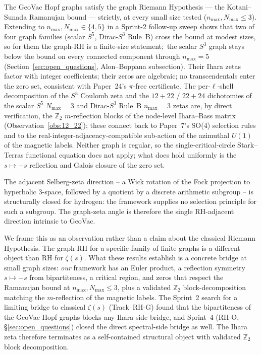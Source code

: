 \documentclass[11pt]{article}
\begin{document}
The GeoVac Hopf graphs satisfy the graph Riemann Hypothesis --- the
Kotani--Sunada Ramanujan bound --- strictly, at every small size
tested ($n_{\max},N_{\max}\le 3$).  Extending to $n_{\max},N_{\max}
\in\{4,5\}$ in a Sprint-2 follow-up sweep shows that two of four
graph families (scalar $S^5$, Dirac-$S^3$ Rule~B) cross the bound at
modest sizes, so for them the graph-RH is a finite-size statement;\
the scalar $S^3$ graph stays below the bound on every connected
component through $n_{\max}=5$ (Section~\ref{sec:open_questions},
Alon--Boppana subsection).  Their Ihara zetas factor with integer coefficients; their
zeros are algebraic; no transcendentals enter the zero set, consistent
with Paper~24's $\pi$-free certificate.  The per-$\ell$-shell
decomposition of the $S^3$ Coulomb zeta and the $12+22$ / $22+24$
dichotomies of the scalar $S^5$ $N_{\max}=3$ and Dirac-$S^3$ Rule~B
$n_{\max}=3$ zetas are, by direct verification, the $\mathbb{Z}_2$
$m$-reflection blocks of the node-level Ihara--Bass matrix
(Observation~\ref{obs:12_22}); these connect back to Paper~7's SO(4)
selection rules and to the real-integer-adjacency-compatible
sub-action of the azimuthal $U(1)$ of the magnetic labels.  Neither graph
is regular, so the single-critical-circle Stark--Terras functional
equation does not apply; what does hold uniformly is the
$s\mapsto -s$ reflection and Galois closure of the zero set.

The adjacent Selberg-zeta direction -- a Wick rotation of the Fock
projection to hyperbolic 3-space, followed by a quotient by a
discrete arithmetic subgroup -- is structurally closed for hydrogen:
the framework supplies no selection principle for such a subgroup.
The graph-zeta angle is therefore the single RH-adjacent direction
intrinsic to GeoVac.

We frame this as an observation rather than a claim about the
classical Riemann Hypothesis.  The graph-RH for a specific family
of finite graphs is a different object than RH for $\zeta(s)$.  What
these results establish is a concrete bridge at small graph sizes:
\emph{our} framework has an Euler product, a reflection symmetry
$s\mapsto -s$ from bipartiteness, a critical region, and zeros that respect
the Ramanujan bound at $n_{\max},N_{\max}\le 3$, plus a validated
$\mathbb{Z}_2$ block-decomposition matching the $m$-reflection of the
magnetic labels.  The Sprint~2 search for a limiting bridge to classical
$\zeta(s)$ (Track~RH-G) found that the bipartiteness of the GeoVac
Hopf graphs blocks any Ihara-side bridge, and Sprint~4 (RH-O,
\S\ref{sec:open_questions}) closed the direct spectral-side bridge as
well.  The Ihara zeta therefore terminates as a self-contained
structural object with validated $\mathbb{Z}_2$ block decomposition.
\end{document}
